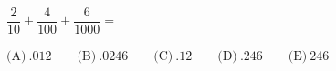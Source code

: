 $\dfrac{2}{10}+\dfrac{4}{100}+\dfrac{6}{1000} =$



$\text{(A)}\ .012 \qquad \text{(B)}\ .0246 \qquad \text{(C)}\ .12 \qquad \text{(D)}\ .246 \qquad \text{(E)}\ 246$
